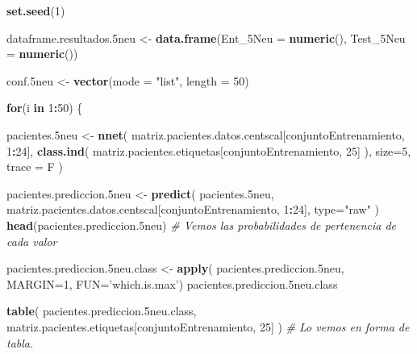 \documentclass[]{article}
\newenvironment{Shaded}{\begin{snugshade}}{\end{snugshade}}
\newcommand{\CommentTok}[1]{\textcolor[rgb]{0.56,0.35,0.01}{\textit{#1}}}
\newcommand{\ControlFlowTok}[1]{\textcolor[rgb]{0.13,0.29,0.53}{\textbf{#1}}}
\newcommand{\DataTypeTok}[1]{\textcolor[rgb]{0.13,0.29,0.53}{#1}}
\newcommand{\DecValTok}[1]{\textcolor[rgb]{0.00,0.00,0.81}{#1}}
\newcommand{\FloatTok}[1]{\textcolor[rgb]{0.00,0.00,0.81}{#1}}
\newcommand{\KeywordTok}[1]{\textcolor[rgb]{0.13,0.29,0.53}{\textbf{#1}}}
\newcommand{\NormalTok}[1]{#1}
\newcommand{\OperatorTok}[1]{\textcolor[rgb]{0.81,0.36,0.00}{\textbf{#1}}}
\newcommand{\StringTok}[1]{\textcolor[rgb]{0.31,0.60,0.02}{#1}}
\begin{document}
\begin{Shaded}
\begin{Highlighting}[]
\KeywordTok{set.seed}\NormalTok{(}\DecValTok{1}\NormalTok{)}

\NormalTok{dataframe.resultados}\FloatTok{.5}\NormalTok{neu <-}\StringTok{ }\KeywordTok{data.frame}\NormalTok{(}\DataTypeTok{Ent_5Neu =} \KeywordTok{numeric}\NormalTok{(),}
                                        \DataTypeTok{Test_5Neu =} \KeywordTok{numeric}\NormalTok{())}

\NormalTok{conf}\FloatTok{.5}\NormalTok{neu <-}\StringTok{ }\KeywordTok{vector}\NormalTok{(}\DataTypeTok{mode =} \StringTok{"list"}\NormalTok{, }\DataTypeTok{length =} \DecValTok{50}\NormalTok{)}

\ControlFlowTok{for}\NormalTok{(i }\ControlFlowTok{in} \DecValTok{1}\OperatorTok{:}\DecValTok{50}\NormalTok{)}
\NormalTok{\{}

\NormalTok{  pacientes}\FloatTok{.5}\NormalTok{neu <-}\StringTok{ }\KeywordTok{nnet}\NormalTok{( matriz.pacientes.datos.centscal[conjuntoEntrenamiento, }\DecValTok{1}\OperatorTok{:}\DecValTok{24}\NormalTok{],}
                          \KeywordTok{class.ind}\NormalTok{( matriz.pacientes.etiquetas[conjuntoEntrenamiento, }\DecValTok{25}\NormalTok{] ),}
                          \DataTypeTok{size=}\DecValTok{5}\NormalTok{,}
                          \DataTypeTok{trace =}\NormalTok{ F )}
  
\NormalTok{  pacientes.prediccion}\FloatTok{.5}\NormalTok{neu <-}\StringTok{ }\KeywordTok{predict}\NormalTok{( pacientes}\FloatTok{.5}\NormalTok{neu, matriz.pacientes.datos.centscal[conjuntoEntrenamiento, }\DecValTok{1}\OperatorTok{:}\DecValTok{24}\NormalTok{], }\DataTypeTok{type=}\StringTok{"raw"}\NormalTok{ )}
  \KeywordTok{head}\NormalTok{(pacientes.prediccion}\FloatTok{.5}\NormalTok{neu) }\CommentTok{# Vemos las probabilidades de pertenencia de cada valor}
  
\NormalTok{  pacientes.prediccion}\FloatTok{.5}\NormalTok{neu.class <-}\StringTok{ }\KeywordTok{apply}\NormalTok{( pacientes.prediccion}\FloatTok{.5}\NormalTok{neu, }\DataTypeTok{MARGIN=}\DecValTok{1}\NormalTok{, }\DataTypeTok{FUN=}\StringTok{'which.is.max'}\NormalTok{)}
\NormalTok{  pacientes.prediccion}\FloatTok{.5}\NormalTok{neu.class}
  
  \KeywordTok{table}\NormalTok{( pacientes.prediccion}\FloatTok{.5}\NormalTok{neu.class, matriz.pacientes.etiquetas[conjuntoEntrenamiento, }\DecValTok{25}\NormalTok{] )  }\CommentTok{# Lo vemos en forma de tabla.}
  

\end{Highlighting}
\end{Shaded}
\end{document}
